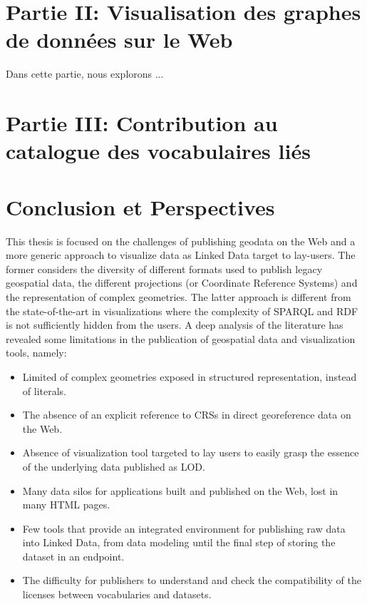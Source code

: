 \documentclass[a4paper,11pt,twoside]{report}
\begin{document}
\chapter*{Partie II: Visualisation des graphes de données sur le Web}

Dans cette partie, nous explorons ...

\chapter*{Partie III: Contribution au catalogue des vocabulaires liés}



\chapter*{ Conclusion et Perspectives}
\label{ch:conc}

This thesis is focused on the challenges of publishing geodata on the Web and a more generic approach to visualize data as Linked Data target to lay-users. The former considers the diversity of different formats used to publish legacy geospatial data, the different projections (or Coordinate Reference Systems) and the representation of complex geometries. The latter approach is different from the state-of-the-art in visualizations where the complexity of SPARQL and RDF is not sufficiently hidden from the users. A deep analysis of the literature has revealed some limitations in the publication of geospatial data and visualization tools, namely:
\begin{itemize}
\item Limited of complex geometries exposed in structured representation, instead of literals. 
\item The absence of an explicit reference to CRSs in direct georeference data on the Web.
\item Absence of visualization tool targeted to lay users to easily grasp the essence of the underlying data published as LOD.  
\item Many data silos for applications built and published on the Web, lost in many HTML pages.
\item Few tools that provide an integrated environment for publishing raw data into Linked Data, from data modeling until the final step of storing the dataset in an endpoint.
\item The difficulty for publishers to understand and check the compatibility of the licenses between vocabularies and datasets.
  
\end{itemize}
\end{document}
